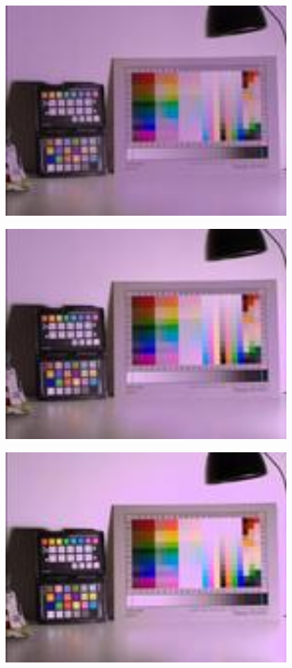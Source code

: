 \begin{center}
\includegraphics[height=8cm]{images/100ms-10ms-32-tiny}
\end{center}

\begin{center}
\includegraphics[height=8cm]{images/100ms-20ms-32-tiny}
\end{center}

\begin{center}
\includegraphics[height=8cm]{images/100ms-35ms-32-tiny}
\end{center}

